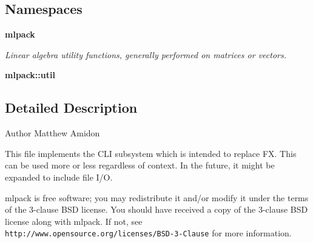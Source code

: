 \subsection*{Namespaces}
\begin{DoxyCompactItemize}
\item 
 {\bf mlpack}
\begin{DoxyCompactList}\small\item\em Linear algebra utility functions, generally performed on matrices or vectors. \end{DoxyCompactList}\item 
 {\bf mlpack\+::util}
\end{DoxyCompactItemize}


\subsection{Detailed Description}
\begin{DoxyAuthor}{Author}
Matthew Amidon
\end{DoxyAuthor}
This file implements the C\+LI subsystem which is intended to replace FX. This can be used more or less regardless of context. In the future, it might be expanded to include file I/O.

mlpack is free software; you may redistribute it and/or modify it under the terms of the 3-\/clause B\+SD license. You should have received a copy of the 3-\/clause B\+SD license along with mlpack. If not, see {\tt http\+://www.\+opensource.\+org/licenses/\+B\+S\+D-\/3-\/\+Clause} for more information. 